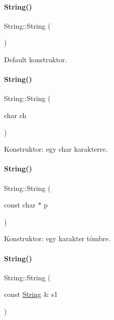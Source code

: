 \paragraph{\texorpdfstring{String()}{String()}\hspace{0.1cm}{\footnotesize\ttfamily [1/4]}}
{\footnotesize\ttfamily String\+::\+String (\begin{DoxyParamCaption}{ }\end{DoxyParamCaption})\hspace{0.3cm}{\ttfamily [inline]}}



Default konstruktor. 

\mbox{\label{class_string_a62a77180f8df2547e8be1313654abcee}} 
\paragraph{\texorpdfstring{String()}{String()}\hspace{0.1cm}{\footnotesize\ttfamily [2/4]}}
{\footnotesize\ttfamily String\+::\+String (\begin{DoxyParamCaption}\item[{char}]{ch }\end{DoxyParamCaption})}



Konstruktor\+: egy char karakterre. 

\mbox{\label{class_string_a09ca4f1436a83ecb1c273a836b7cd4c6}} 
\paragraph{\texorpdfstring{String()}{String()}\hspace{0.1cm}{\footnotesize\ttfamily [3/4]}}
{\footnotesize\ttfamily String\+::\+String (\begin{DoxyParamCaption}\item[{const char $\ast$}]{p }\end{DoxyParamCaption})}



Konstruktor\+: egy karakter tömbre. 

\mbox{\label{class_string_a3c682dc983b45bdbb7f3858fe4cbf221}} 
\paragraph{\texorpdfstring{String()}{String()}\hspace{0.1cm}{\footnotesize\ttfamily [4/4]}}
{\footnotesize\ttfamily String\+::\+String (\begin{DoxyParamCaption}\item[{const \mbox{\hyperlink{class_string}{String}} \&}]{s1 }\end{DoxyParamCaption})}



